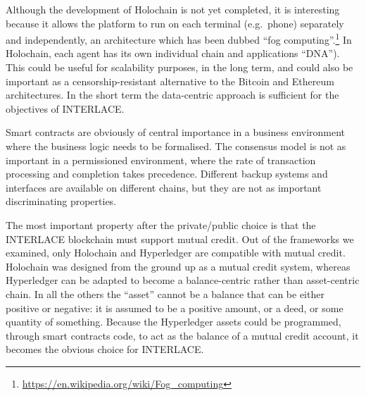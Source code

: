 Although the development of Holochain is not yet completed, it is interesting because it allows the platform to run on each terminal (e.g.\ phone) separately and independently, an architecture which has been dubbed ``fog computing''.\footnote{\url{https://en.wikipedia.org/wiki/Fog_computing}} In Holochain, each agent has its own individual chain and applications ``DNA''). This could be useful for scalability purposes, in the long term, and could also be important as a censorship-resistant alternative to the Bitcoin and Ethereum architectures. In the short term the data-centric approach is sufficient for the objectives of INTERLACE.

Smart contracts are obviously of central importance in a business environment where the business logic needs to be formalised. The consensus model is not as important in a permissioned environment, where the rate of transaction processing and completion takes precedence. Different backup systems and interfaces are available on different chains, but they are not as important discriminating properties.

The most important property after the private/public choice is that the INTERLACE blockchain must support mutual credit. Out of the frameworks we examined, only Holochain and Hyperledger are compatible with mutual credit. Holochain was designed from the ground up as a mutual credit system, whereas Hyperledger can be adapted to become a balance-centric rather than asset-centric chain. In all the others the ``asset'' cannot be a balance that can be either positive or negative: it is assumed to be a positive amount, or a deed, or some quantity of something. Because the Hyperledger assets could be programmed, through smart contracts code, to act as the balance of a mutual credit account, it becomes the obvious choice for INTERLACE.

